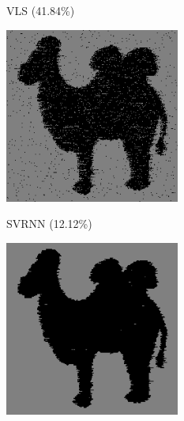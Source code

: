 \documentclass{article}
\begin{document}
\begin{figure}[htb]
\begin{minipage}[b]{0.30\linewidth}
        \centerline{VLS (41.84\%)}\medskip      \end{minipage}
      \hfill
      \begin{minipage}[b]{.30\linewidth}
        \centering
        \centerline{\includegraphics[width=\textwidth,cfbox=black 1pt 0pt]{ress/camel40/camel40_svrnn_2.png}}
        \centerline{SVRNN (12.12\%)}\medskip
      \end{minipage}
      \hfill
      \begin{minipage}[b]{0.30\linewidth}
        \centering
        \centerline{\includegraphics[width=\textwidth,cfbox=black 1pt 0pt]{ress/camel40/camel40_tmm_3.png}}

\end{minipage}
\end{figure}
\end{document}
